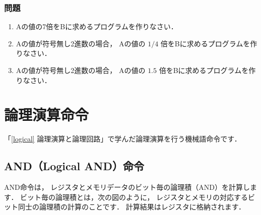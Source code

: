 \vfill
\subsubsection{問題}
\begin{enumerate}
\item Aの値の7倍をBに求めるプログラムを作りなさい．
\item Aの値が符号無し2進数の場合，
Aの値の $1/4$ 倍をBに求めるプログラムを作りなさい．
\item Aの値が符号無し2進数の場合，
Aの値の $1.5$ 倍をBに求めるプログラムを作りなさい．
\end{enumerate}
\vfill

\newpage
\section{論理演算命令}
「\ref{logical} 論理演算と論理回路」で学んだ論理演算を行う機械語命令です．

\subsection{AND（Logical AND）命令}
AND命令は，
レジスタとメモリデータのビット毎の論理積（AND）を計算します．
ビット毎の論理積とは，次の図のように，
レジスタとメモリの対応するビット同士の論理積の計算のことです．
計算結果はレジスタに格納されます．

\begin{center}
\end{center}

